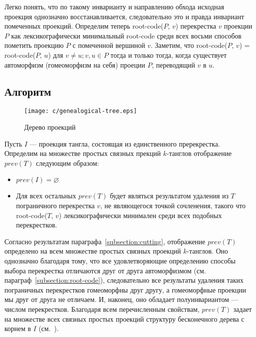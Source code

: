 		Легко понять, что по такому инварианту и направлению обхода исходная проекция однозначно восстанавливается, следовательно
		это и правда инвариант помеченных проекций. Определим теперь root-code($P$, $v$) перекрестка $v$ проекции $P$ как
		лексикографически минимальный root-code среди всех восьми способов пометить проекцию $P$ с помеченной вершиной $v$. Заметим,
		что root-code($P$, $v$) = root-code($P$, $u$) для $v \neq u; v, u \in P$ тогда и только тогда, когда существует автоморфизм
		(гомеоморфизм на себя) проеции $P$, переводящий $v$ в $u$.

	\subsection{Алгоритм}

		\begin{figure}[ht]
			\centering
			\texttt{[image: c/genealogical-tree.eps]}
			\caption{Дерево проекций\label{figure:genealogical-tree}}
		\end{figure}

		\begin{definition}
			Пусть $I$ --- проекция тангла, состоящая из единственного пререкрестка. Определим на множестве простых связных
			прекций $k$-танглов отображение $prev(T)$ следующим образом:
			\begin{itemize}
				\item
				$prev(I) = \varnothing$

				\item
				Для всех остальных $prev(T)$ будет являться результатом удаления из $T$ пограничного перекрестка $v$, не
				являющегося точкой сочленения, такого что root-code($T$, $v$) лексикографически минимален среди всех подобных
				перекрестков.
			\end{itemize}
		\end{definition}

		Согласно результатам параграфа~\ref{subsection:cutting}, отображение $prev(T)$ определено на всем множестве простых связных
		проекций $k$-танглов. Оно однозначно благодаря тому, что все удовлетворяющие определению способы выбора перекрестка отличаются
		друг от друга автоморфизмом (см. параграф~\ref{subsection:root-code}), следовательно все результаты удаления таких пограничных
		перекрестков гомеоморфны друг другу, а гомеоморфные проекции мы друг от друга не отличаем. И, наконец, оно обладает
		полуинвариантом --- числом перекрестков. Благодаря всем перечисленным свойствам, $prev(T)$ задает на множестве всех связных
		простых проекций структуру бесконечного дерева с корнем в $I$ (см.~).

